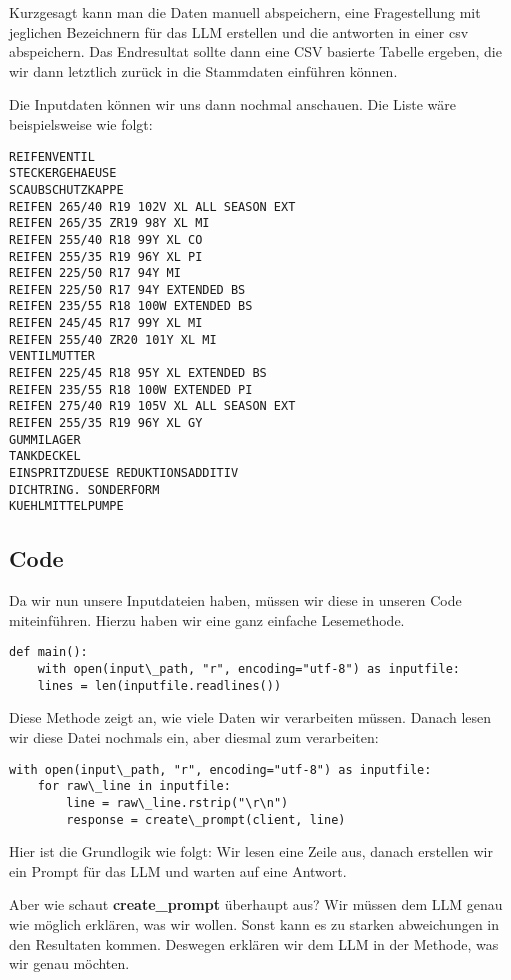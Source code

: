 Kurzgesagt kann man die Daten manuell abspeichern, eine Fragestellung mit jeglichen
Bezeichnern für das LLM erstellen und die antworten in einer csv abspeichern.
Das Endresultat sollte dann eine CSV basierte Tabelle ergeben, die wir dann
letztlich zurück in die Stammdaten einführen können.

Die Inputdaten können wir uns dann nochmal anschauen. Die Liste wäre beispielsweise wie folgt:

\begin{lstlisting}
REIFENVENTIL
STECKERGEHAEUSE
SCAUBSCHUTZKAPPE
REIFEN 265/40 R19 102V XL ALL SEASON EXT
REIFEN 265/35 ZR19 98Y XL MI
REIFEN 255/40 R18 99Y XL CO
REIFEN 255/35 R19 96Y XL PI
REIFEN 225/50 R17 94Y MI
REIFEN 225/50 R17 94Y EXTENDED BS
REIFEN 235/55 R18 100W EXTENDED BS
REIFEN 245/45 R17 99Y XL MI
REIFEN 255/40 ZR20 101Y XL MI
VENTILMUTTER
REIFEN 225/45 R18 95Y XL EXTENDED BS
REIFEN 235/55 R18 100W EXTENDED PI
REIFEN 275/40 R19 105V XL ALL SEASON EXT
REIFEN 255/35 R19 96Y XL GY
GUMMILAGER
TANKDECKEL
EINSPRITZDUESE REDUKTIONSADDITIV
DICHTRING. SONDERFORM
KUEHLMITTELPUMPE
\end{lstlisting}

\subsection{Code}

Da wir nun unsere Inputdateien haben, müssen wir diese in unseren Code miteinführen.
Hierzu haben wir eine ganz einfache Lesemethode.

\begin{lstlisting}
def main():
    with open(input\_path, "r", encoding="utf-8") as inputfile:
    lines = len(inputfile.readlines())
\end{lstlisting}

Diese Methode zeigt an, wie viele Daten wir verarbeiten müssen.
Danach lesen wir diese Datei nochmals ein, aber diesmal zum verarbeiten:

\begin{lstlisting}
with open(input\_path, "r", encoding="utf-8") as inputfile:
    for raw\_line in inputfile:
        line = raw\_line.rstrip("\r\n")
        response = create\_prompt(client, line)
\end{lstlisting}

Hier ist die Grundlogik wie folgt: Wir lesen eine Zeile aus,
danach erstellen wir ein Prompt für das LLM und warten auf eine Antwort.

Aber wie schaut \textbf{create\_prompt} überhaupt aus?
Wir müssen dem LLM genau wie möglich erklären, was wir wollen.
Sonst kann es zu starken abweichungen in den Resultaten kommen.
Deswegen erklären wir dem LLM in der Methode, was wir genau möchten.

